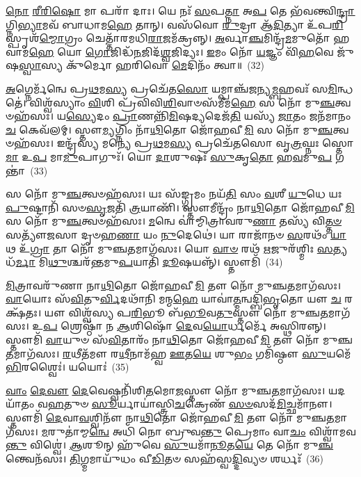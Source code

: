 \-\ul{𑌨𑍋} \ul{𑌰𑍀}\-\-\ul{𑌰𑌿}\-\-\ul{𑌷𑍋} 𑌮𑌾 𑌪𑌰𑌾᳴ 𑌦𑌾𑌃। 𑌯𑍇 𑌨𑌃᳴ \ul{𑌸}\-𑌪\-\ul{𑌤𑍍𑌨𑌾} 𑌅\-\ul{𑌪} 𑌤𑍇 𑌭᳴𑌵𑌨𑍍𑌤𑍍𑌵𑌿\-\ul{𑌨𑍍𑌦𑍍𑌰𑌾}\-𑌗𑍍𑌨𑌿\-\ul{𑌭𑍍𑌯𑌾}\-𑌮𑌵᳴ 𑌬𑌾𑌧𑌾𑌮\-\ul{𑌹𑍇} 𑌤𑌾𑌨𑍍। 𑌵𑌸᳴𑌵𑍋 \ul{𑌰𑍁}\-𑌦𑍍𑌰𑌾 𑌆᳴\-\ul{𑌦𑌿}\-𑌤𑍍𑌯𑌾 𑌉᳴𑌪\-\ul{𑌰𑌿}\-𑌸𑍍𑌪𑍃𑌶᳴\-\ul{𑌮𑍍𑌮𑍋}\-𑌗𑍍𑌰𑌂 𑌚𑍇𑌤𑍍𑌤𑌾᳴𑌰𑌮𑌧𑌿\-\ul{𑌰𑌾}\-𑌜𑌮᳴𑌕𑍍𑌰𑌨𑍍𑌨𑍍। \ul{𑌅}\-𑌰𑍍𑌵𑌾\-\ul{𑌞𑍍𑌚}\-𑌮𑌿𑌨𑍍𑌦𑍍𑌰᳴\-\ul{𑌮}\-𑌮𑍁𑌤𑍋᳴ 𑌹𑌵𑌾𑌮\-\ul{𑌹𑍇} 𑌯𑍋 \ul{𑌗𑍋}\-𑌜𑌿𑌦𑍍𑌧᳴\-\ul{𑌨}\-𑌜𑌿𑌦᳴\-\ul{𑌶𑍍𑌵}\-𑌜𑌿𑌦𑍍𑌯𑌃। \ul{𑌇}\-𑌮𑌂 𑌨𑍋᳴ \ul{𑌯}\-𑌜𑍍𑌞𑌂 𑌵𑌿᳴\-\ul{𑌹}\-𑌵𑍇 𑌜𑍁᳴𑌷\-\ul{𑌸𑍍𑌵𑌾}\-𑌸𑍍𑌯 𑌕𑍁᳴𑌰𑍍𑌮𑍋 𑌹𑌰𑌿𑌵𑍋 \ul{𑌮𑍇}\-𑌦𑌿𑌨𑌂᳴ 𑌤𑍍𑌵𑌾॥~(32)

{\anuvakamend[{\-\ul{𑌵}\-\-\ul{𑌨𑌿}\-\-\ul{𑌷}\-\-\ul{𑌨𑍍𑌤} \ul{𑌪𑍁}\-𑌰\-\ul{𑌸𑍍𑌤𑌾}\-𑌨𑍍𑌮𑌾 𑌤𑍍𑌰𑌿𑌚᳴𑌤𑍍𑌵𑌾𑌰𑌿𑍞𑌶𑌚𑍍𑌚}]}%

\-\ul{𑌅}\-𑌗𑍍𑌨𑍇𑌰𑍍𑌮᳴𑌨𑍍𑌵𑍇 𑌪𑍍𑌰\-\ul{𑌥}\-𑌮\-\ul{𑌸𑍍𑌯} 𑌪𑍍𑌰𑌚𑍇᳴𑌤\-\ul{𑌸𑍋} 𑌯𑌮𑍍𑌪𑌾𑌞𑍍𑌚᳴𑌜𑌨𑍍𑌯\-\ul{𑌮𑍍𑌬}\-𑌹𑌵𑌃᳴ 𑌸\-\ul{𑌮𑌿}\-𑌨𑍍𑌧𑌤𑍇॑। 𑌵𑌿𑌶𑍍𑌵᳴𑌸𑍍𑌯𑌾𑌂 \ul{𑌵𑌿}\-𑌶𑌿 𑌪𑍍𑌰᳴𑌵𑌿𑌵𑌿\-\ul{𑌶𑌿}\-𑌵𑌾𑍞𑌸᳴𑌮𑍀𑌮\-\ul{𑌹𑍇} 𑌸 𑌨𑍋᳴ 𑌮𑍁\-\ul{𑌞𑍍𑌚}\-𑌤𑍍𑌵𑍞𑌹᳴𑌸𑌃। 𑌯\-\ul{𑌸𑍍𑌯𑍇}\-𑌦𑌂 \ul{𑌪𑍍𑌰𑌾}\-𑌣𑌨𑍍𑌨𑌿᳴\-\ul{𑌮𑌿}\-𑌷𑌦𑍍𑌯𑌦𑍇𑌜᳴\-\ul{𑌤𑌿} 𑌯𑌸𑍍𑌯᳴ \ul{𑌜𑌾}\-𑌤𑌂 𑌜𑌨᳴𑌮𑌾𑌨𑌂 \ul{𑌚} 𑌕𑍇𑌵᳴𑌲𑌮𑍍। 𑌸𑍍𑌤𑍗\-\ul{𑌮𑍍𑌯}\-𑌗𑍍𑌨𑌿𑌂 𑌨𑌾᳴\-\ul{𑌥𑌿}\-𑌤𑍋 𑌜𑍋᳴𑌹𑌵𑍀\-\ul{𑌮𑌿} 𑌸 𑌨𑍋᳴ 𑌮𑍁\-\ul{𑌞𑍍𑌚}\-𑌤𑍍𑌵𑍞𑌹᳴𑌸𑌃। 𑌇𑌨𑍍𑌦𑍍𑌰᳴𑌸𑍍𑌯 𑌮𑌨𑍍𑌯𑍇 𑌪𑍍𑌰\-\ul{𑌥}\-𑌮\-\ul{𑌸𑍍𑌯} 𑌪𑍍𑌰𑌚𑍇᳴𑌤𑌸𑍋 𑌵𑍃\-\ul{𑌤𑍍𑌰}\-𑌘𑍍𑌨𑌃 𑌸𑍍𑌤𑍋\-\ul{𑌮𑌾} 𑌉\-\ul{𑌪} 𑌮𑌾\-\ul{𑌮𑍁}\-𑌪𑌾𑌗𑍁𑌃᳴। 𑌯𑍋 \ul{𑌦𑌾}\-𑌶𑍁𑌷𑌃᳴ \ul{𑌸𑍁}\-𑌕𑍃\-\ul{𑌤𑍋} 𑌹\-\ul{𑌵}\-𑌮𑍁\-\ul{𑌪} 𑌗𑌨𑍍𑌤𑌾॑~(33)

𑌸 𑌨𑍋᳴ 𑌮𑍁\-\ul{𑌞𑍍𑌚}\-𑌤𑍍𑌵𑍞𑌹᳴𑌸𑌃। 𑌯𑌃 𑌸᳴𑌙𑍍𑌗𑍍𑌰𑌮𑌂 𑌨𑌯᳴\-\ul{𑌤𑌿} 𑌸𑌂 \ul{𑌵}\-𑌶𑍀 \ul{𑌯𑍁}\-𑌧𑍇 𑌯𑌃 \ul{𑌪𑍁}\-𑌷𑍍𑌟𑌾𑌨𑌿᳴ 𑌸𑍞\-\ul{𑌸𑍃}\-𑌜𑌤𑌿᳴ \ul{𑌤𑍍𑌰}\-𑌯𑌾𑌣𑌿᳴। 𑌸𑍍𑌤𑍗𑌮𑍀𑌨𑍍𑌦𑍍𑌰𑌂᳴ 𑌨𑌾\-\ul{𑌥𑌿}\-𑌤𑍋 𑌜𑍋᳴𑌹𑌵𑍀\-\ul{𑌮𑌿} 𑌸 𑌨𑍋᳴ 𑌮𑍁\-\ul{𑌞𑍍𑌚}\-𑌤𑍍𑌵𑍞𑌹᳴𑌸𑌃। \ul{𑌮}\-𑌨𑍍𑌵𑍇 𑌵𑌾॑𑌮𑍍𑌮𑌿𑌤𑍍𑌰𑌾𑌵𑌰𑍁\-\ul{𑌣𑌾} 𑌤𑌸𑍍𑌯᳴ 𑌵𑌿\-\ul{𑌤𑍍𑌤}\-\-\ul{𑍞} 𑌸𑌤𑍍𑌯𑍗᳴𑌜𑌸𑌾 𑌦𑍃𑍞𑌹\-\ul{𑌣𑌾} 𑌯𑌂 \ul{𑌨𑍁}\-𑌦𑍇𑌥𑍇॑। 𑌯𑌾 𑌰𑌾𑌜𑌾᳴𑌨𑍞 \ul{𑌸}\-𑌰𑌥𑌂᳴ \ul{𑌯𑌾}\-𑌥 𑌉᳴\-\ul{𑌗𑍍𑌰𑌾} 𑌤𑌾 𑌨𑍋᳴ 𑌮𑍁𑌞𑍍𑌚\-\ul{𑌤}\-𑌮𑌾𑌗᳴𑌸𑌃। 𑌯𑍋 \ul{𑌵𑌾}\-\-\ul{𑍞} 𑌰𑌥᳴ \ul{𑌋}\-𑌜𑍁𑌰᳴𑌶𑍍𑌮𑌿𑌃 \ul{𑌸}\-𑌤𑍍𑌯𑌧᳴\-\ul{𑌰𑍍𑌮𑌾} 𑌮𑌿\-\ul{𑌥𑍁}\-𑌶𑍍𑌚𑌰᳴𑌨𑍍𑌤𑌮𑍁\-\ul{𑌪}\-𑌯𑌾𑌤𑌿᳴ \ul{𑌦𑍂}\-𑌷𑌯𑌨𑍍𑌨𑍍᳴। 𑌸𑍍𑌤𑍗𑌮𑌿᳴~(34)

\-\ul{𑌮𑌿}\-𑌤𑍍𑌰𑌾𑌵𑌰𑍁᳴𑌣𑌾 𑌨𑌾\-\ul{𑌥𑌿}\-𑌤𑍋 𑌜𑍋᳴𑌹𑌵𑍀\-\ul{𑌮𑌿} 𑌤𑍗 𑌨𑍋᳴ 𑌮𑍁𑌞𑍍𑌚\-\ul{𑌤}\-𑌮𑌾𑌗᳴𑌸𑌃। \ul{𑌵𑌾}\-𑌯𑍋𑌃 𑌸᳴\-\ul{𑌵𑌿}\-𑌤𑍁\-\ul{𑌰𑍍𑌵𑌿}\-𑌦𑌥𑌾᳴𑌨𑌿 𑌮𑌨𑍍𑌮\-\ul{𑌹𑍇} 𑌯𑌾𑌵𑌾॑\-\ul{𑌤𑍍𑌮}\-𑌨𑍍𑌵𑌦𑍍𑌬𑌿᳴\-\ul{𑌭𑍃}\-𑌤𑍋 𑌯𑍗 \ul{𑌚} 𑌰𑌕𑍍𑌷᳴𑌤𑌃। 𑌯𑍗 𑌵𑌿𑌶𑍍𑌵᳴𑌸𑍍𑌯 𑌪\-\ul{𑌰𑌿}\-𑌭𑍂 𑌬᳴\-\ul{𑌭𑍂}\-𑌵\-\ul{𑌤𑍁}\-𑌸𑍍𑌤𑍗 𑌨𑍋᳴ 𑌮𑍁𑌞𑍍𑌚\-\ul{𑌤}\-𑌮𑌾𑌗᳴𑌸𑌃। 𑌉\-\ul{𑌪} 𑌶𑍍𑌰𑍇𑌷𑍍𑌠𑌾᳴ 𑌨 \ul{𑌆}\-𑌶𑌿𑌷𑍋᳴ \ul{𑌦𑍇}\-𑌵\-\ul{𑌯𑍋}\-𑌰𑍍𑌧𑌰𑍍𑌮𑍇᳴ 𑌅𑌸𑍍𑌥𑌿𑌰𑌨𑍍𑌨𑍍। 𑌸𑍍𑌤𑍗𑌮𑌿᳴ \ul{𑌵𑌾}\-𑌯𑍁𑍞 𑌸᳴\-\ul{𑌵𑌿}\-𑌤𑌾𑌰𑌂᳴ 𑌨𑌾\-\ul{𑌥𑌿}\-𑌤𑍋 𑌜𑍋᳴𑌹𑌵𑍀\-\ul{𑌮𑌿} 𑌤𑍗 𑌨𑍋᳴ 𑌮𑍁𑌞𑍍𑌚\-\ul{𑌤}\-𑌮𑌾𑌗᳴𑌸𑌃। \ul{𑌰}\-𑌥𑍀𑌤᳴𑌮𑍗 𑌰\-\ul{𑌥𑍀}\-𑌨𑌾𑌮᳴𑌹𑍍𑌵 \ul{𑌊}\-𑌤\-\ul{𑌯𑍇} 𑌶𑍁\-\ul{𑌭𑌂} 𑌗𑌮𑌿᳴𑌷𑍍𑌠𑍗 \ul{𑌸𑍁}\-𑌯𑌮𑍇᳴\-\ul{𑌭𑌿}\-𑌰𑌶𑍍𑌵𑍈𑌃॑। 𑌯𑌯𑍋𑌃॑~(35)

\-\ul{𑌵𑌾𑌂} \ul{𑌦𑍇}\-\-\ul{𑌵𑍗} \ul{𑌦𑍇}\-𑌵𑍇𑌷𑍍𑌵𑌨𑌿᳴𑌶𑌿\-\ul{𑌤}\-𑌮𑍋\-\ul{𑌜}\-𑌸𑍍𑌤𑍗 𑌨𑍋᳴ 𑌮𑍁𑌞𑍍𑌚\-\ul{𑌤}\-𑌮𑌾𑌗᳴𑌸𑌃। 𑌯𑌦𑌯𑌾᳴𑌤𑌂 𑌵\-\ul{𑌹}\-𑌤𑍁𑍞 \ul{𑌸𑍂}\-𑌰𑍍𑌯𑌾𑌯𑌾॑𑌸𑍍𑌤𑍍𑌰𑌿\-\ul{𑌚}\-𑌕𑍍𑌰𑍇𑌣᳴ \ul{𑌸}\-\-\ul{𑍞}\-𑌸𑌦᳴\-\ul{𑌮𑌿}\-𑌚𑍍𑌛𑌮𑌾᳴𑌨𑍗। 𑌸𑍍𑌤𑍗𑌮𑌿᳴ \ul{𑌦𑍇}\-𑌵𑌾\-\ul{𑌵}\-𑌶𑍍𑌵𑌿𑌨𑍗᳴ 𑌨𑌾\-\ul{𑌥𑌿}\-𑌤𑍋 𑌜𑍋᳴𑌹𑌵𑍀\-\ul{𑌮𑌿} 𑌤𑍗 𑌨𑍋᳴ 𑌮𑍁𑌞𑍍𑌚\-\ul{𑌤}\-𑌮𑌾𑌗᳴𑌸𑌃। \ul{𑌮}\-𑌰𑍁𑌤𑌾॑𑌮𑍍𑌮\-\ul{𑌨𑍍𑌵𑍇} 𑌅𑌧𑌿᳴ 𑌨𑍋 𑌬𑍍𑌰𑍁𑌵\-\ul{𑌨𑍍𑌤𑍁} 𑌪𑍍𑌰𑍇𑌮𑌾𑌂 𑌵𑌾\-\ul{𑌚𑌂} 𑌵𑌿𑌶𑍍𑌵𑌾᳴𑌮𑌵\-\ul{𑌨𑍍𑌤𑍁} 𑌵𑌿𑌶𑍍𑌵𑍇॑। \ul{𑌆}\-𑌶𑍂𑌨𑍍 𑌹𑍁᳴𑌵𑍇 \ul{𑌸𑍁}\-𑌯𑌮𑌾᳴\-\ul{𑌨𑍂}\-𑌤\-\ul{𑌯𑍇} 𑌤𑍇 𑌨𑍋᳴ 𑌮𑍁\-\ul{𑌞𑍍𑌚}\-𑌨𑍍𑌤𑍍𑌵𑍇𑌨᳴𑌸𑌃। \ul{𑌤𑌿}\-𑌗𑍍𑌮𑌮𑌾𑌯𑍁᳴𑌧𑌂 𑌵𑍀\-\ul{𑌡𑌿}\-𑌤𑍞 𑌸𑌹᳴𑌸𑍍𑌵\-\ul{𑌦𑍍𑌦𑌿}\-𑌵𑍍𑌯𑍞 𑌶𑌰𑍍𑌧𑌃᳴~(36)

